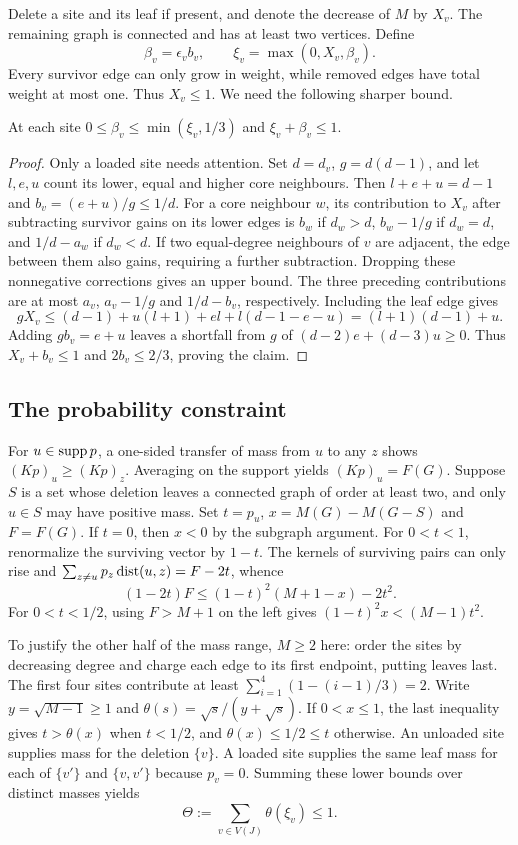 Delete a site and its leaf if present, and denote the decrease of $M$ by $X_v$. The remaining graph is connected and has at least two vertices. Define
\[
 \beta_v=\epsilon_v b_v,\qquad \xi_v=\max(0,X_v,\beta_v).
\]
Every survivor edge can only grow in weight, while removed edges have total weight at most one. Thus $X_v\le1$. We need the following sharper bound.
\begin{lemma}\label{weight:local}
At each site $0\le\beta_v\le\min(\xi_v,1/3)$ and $\xi_v+\beta_v\le1$.
\end{lemma}
\begin{proof}
Only a loaded site needs attention. Set $d=d_v$, $g=d(d-1)$, and let $l,e,u$ count its lower, equal and higher core neighbours. Then $l+e+u=d-1$ and $b_v=(e+u)/g\le1/d$. For a core neighbour $w$, its contribution to $X_v$ after subtracting survivor gains on its lower edges is $b_w$ if $d_w>d$, $b_w-1/g$ if $d_w=d$, and $1/d-a_w$ if $d_w<d$. If two equal-degree neighbours of $v$ are adjacent, the edge between them also gains, requiring a further subtraction. Dropping these nonnegative corrections gives an upper bound. The three preceding contributions are at most $a_v$, $a_v-1/g$ and $1/d-b_v$, respectively. Including the leaf edge gives
\[
 g X_v\le(d-1)+u(l+1)+el+l(d-1-e-u)=(l+1)(d-1)+u.
\]
Adding $gb_v=e+u$ leaves a shortfall from $g$ of $(d-2)e+(d-3)u\ge0$. Thus $X_v+b_v\le1$ and $2b_v\le2/3$, proving the claim.
\end{proof}
\subsection{The probability constraint}
For $u\in\operatorname{supp} p$, a one-sided transfer of mass from $u$ to any $z$ shows $(Kp)_u\ge(Kp)_z$. Averaging on the support yields $(Kp)_u=F(G)$. Suppose $S$ is a set whose deletion leaves a connected graph of order at least two, and only $u\in S$ may have positive mass. Set $t=p_u$, $x=M(G)-M(G-S)$ and $F=F(G)$. If $t=0$, then $x<0$ by the subgraph argument. For $0<t<1$, renormalize the surviving vector by $1-t$. The kernels of surviving pairs can only rise and $\sum_{z\ne u}p_z\operatorname{dist}(u,z)=F-2t$, whence
\[
 (1-2t)F\le (1-t)^2(M+1-x)-2t^2 .
\]
For $0<t<1/2$, using $F>M+1$ on the left gives $(1-t)^2x<(M-1)t^2$.

To justify the other half of the mass range, $M\ge2$ here: order the sites by decreasing degree and charge each edge to its first endpoint, putting leaves last. The first four sites contribute at least $\sum_{i=1}^4(1-(i-1)/3)=2$. Write $y=\sqrt{M-1}\ge1$ and $\theta(s)=\sqrt s/(y+\sqrt s)$. If $0<x\le1$, the last inequality gives $t>\theta(x)$ when $t<1/2$, and $\theta(x)\le1/2\le t$ otherwise. An unloaded site supplies mass for the deletion $\{v\}$. A loaded site supplies the same leaf mass for each of $\{v'\}$ and $\{v,v'\}$ because $p_v=0$. Summing these lower bounds over distinct masses yields
\begin{equation}
 \Theta:=\sum_{v\in V(J)}\theta(\xi_v)\le1.\label{weight:budget}
\end{equation}


